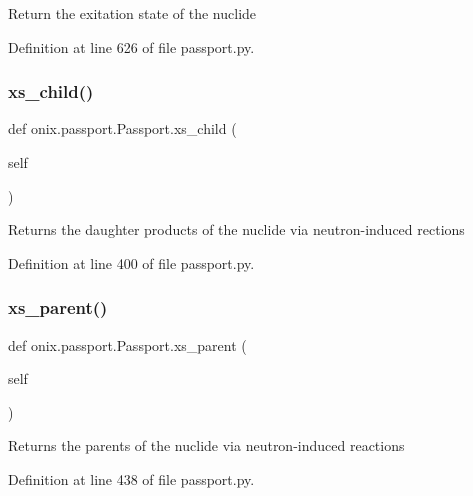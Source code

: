 \begin{DoxyVerb}Return the exitation state of the nuclide\end{DoxyVerb}
 

Definition at line 626 of file passport.\+py.

\mbox{\label{classonix_1_1passport_1_1Passport_ac3c56a0ae9cd879601684ce35e95b69d}} 
\subsubsection{\texorpdfstring{xs\+\_\+child()}{xs\_child()}}
{\footnotesize\ttfamily def onix.\+passport.\+Passport.\+xs\+\_\+child (\begin{DoxyParamCaption}\item[{}]{self }\end{DoxyParamCaption})}

\begin{DoxyVerb}Returns the daughter products of the nuclide via neutron-induced rections\end{DoxyVerb}
 

Definition at line 400 of file passport.\+py.

\mbox{\label{classonix_1_1passport_1_1Passport_a89835c749b6828a69d24407460dab23f}} 
\subsubsection{\texorpdfstring{xs\+\_\+parent()}{xs\_parent()}}
{\footnotesize\ttfamily def onix.\+passport.\+Passport.\+xs\+\_\+parent (\begin{DoxyParamCaption}\item[{}]{self }\end{DoxyParamCaption})}

\begin{DoxyVerb}Returns the parents of the nuclide via neutron-induced reactions\end{DoxyVerb}
 

Definition at line 438 of file passport.\+py.

